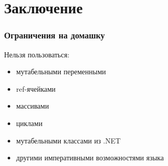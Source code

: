 \documentclass[xetex,mathserif,serif]{beamer}
\begin{document}
	\section{Заключение}

	\begin{frame}
		\frametitle{Ограничения на домашку}
		Нельзя пользоваться:
		\begin{itemize}
			\item мутабельными переменными
			\item ref-ячейками
			\item массивами
			\item циклами
			\item мутабельными классами из .NET
			\item другими императивными возможностями языка
		\end{itemize}
	\end{frame}
\end{document}
